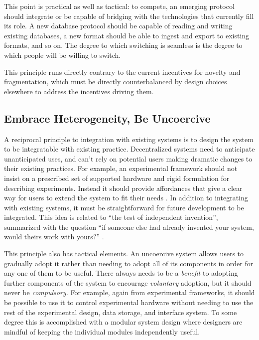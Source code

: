 \documentclass[notoc]{tufte-book}
\begin{document}
This point is practical as well as tactical: to compete, an emerging
protocol should integrate or be capable of bridging with the
technologies that currently fill its role. A new database protocol
should be capable of reading and writing existing databases, a new
format should be able to ingest and export to existing formats, and so
on. The degree to which switching is seamless is the degree to which
people will be willing to switch.

This principle runs directly contrary to the current incentives for
novelty and fragmentation, which must be directly counterbalanced by
design choices elsewhere to address the incentives driving them.


\subsection{Embrace Heterogeneity, Be
Uncoercive}

A reciprocal principle to integration with existing systems is to design
the system to be integratable with existing practice. Decentralized
systems need to anticipate unanticipated uses, and can't rely on
potential users making dramatic changes to their existing practices. For
example, an experimental framework should not insist on a prescribed set
of supported hardware and rigid formulation for describing experiments.
Instead it should provide affordances that give a clear way for users to
extend the system to fit their needs \citep{carpenterRFC1958Architectural1996} . In addition to integrating with
existing systems, it must be straightforward for future development to
be integrated. This idea is related to ``the test of independent
invention'', summarized with the question ``if someone else had already
invented your system, would theirs work with yours?'' \citep{berners-leePrinciplesDesign1998} .

This principle also has tactical elements. An uncoercive system allows
users to gradually adopt it rather than needing to adopt all of its
components in order for any one of them to be useful. There always needs
to be a \emph{benefit} to adopting further components of the system to
encourage \emph{voluntary} adoption, but it should never be
\emph{compulsory.} For example, again from experimental frameworks, it
should be possible to use it to control experimental hardware without
needing to use the rest of the experimental design, data storage, and
interface system. To some degree this is accomplished with a modular
system design where designers are mindful of keeping the individual
modules independently useful.
\end{document}
